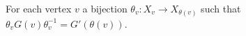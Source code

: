 \documentclass[preview]{standalone}
\begin{document}
For each vertex $v$ a bijection $\theta_v : X_v \to X_{\theta(v)}$ such that $\theta_v G(v)\theta_v^{-1} = G'(\theta(v))$.\\
\end{document}
